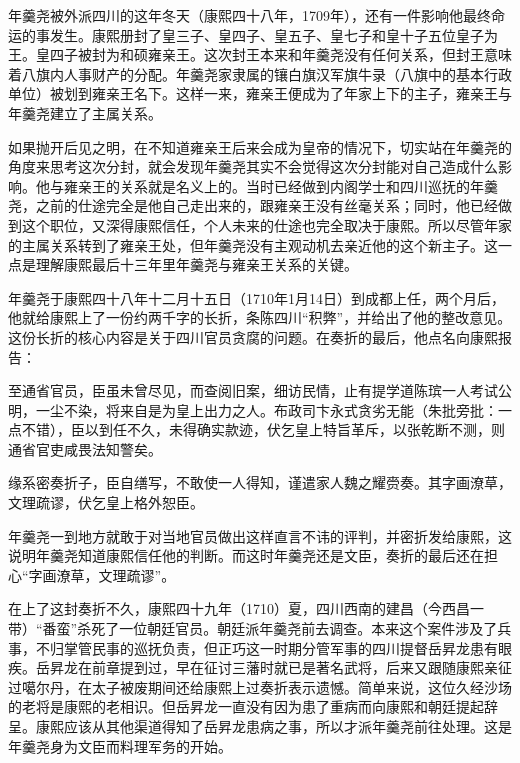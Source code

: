 
年羹尧被外派四川的这年冬天（康熙四十八年，1709年），还有一件影响他最终命运的事发生。康熙册封了皇三子、皇四子、皇五子、皇七子和皇十子五位皇子为王。皇四子被封为和硕雍亲王。这次封王本来和年羹尧没有任何关系，但封王意味着八旗内人事财产的分配。年羹尧家隶属的镶白旗汉军旗牛录（八旗中的基本行政单位）被划到雍亲王名下。这样一来，雍亲王便成为了年家上下的主子，雍亲王与年羹尧建立了主属关系。



如果抛开后见之明，在不知道雍亲王后来会成为皇帝的情况下，切实站在年羹尧的角度来思考这次分封，就会发现年羹尧其实不会觉得这次分封能对自己造成什么影响。他与雍亲王的关系就是名义上的。当时已经做到内阁学士和四川巡抚的年羹尧，之前的仕途完全是他自己走出来的，跟雍亲王没有丝毫关系；同时，他已经做到这个职位，又深得康熙信任，个人未来的仕途也完全取决于康熙。所以尽管年家的主属关系转到了雍亲王处，但年羹尧没有主观动机去亲近他的这个新主子。这一点是理解康熙最后十三年里年羹尧与雍亲王关系的关键。



年羹尧于康熙四十八年十二月十五日（1710年1月14日）到成都上任，两个月后，他就给康熙上了一份约两千字的长折，条陈四川“积弊”，并给出了他的整改意见。这份长折的核心内容是关于四川官员贪腐的问题。在奏折的最后，他点名向康熙报告：



\begin{bookquote}至通省官员，臣虽未曾尽见，而查阅旧案，细访民情，止有提学道陈瑸一人考试公明，一尘不染，将来自是为皇上出力之人。布政司卞永式贪劣无能（朱批旁批：一点不错），臣以到任不久，未得确实款迹，伏乞皇上特旨革斥，以张乾断不测，则通省官吏咸畏法知警矣。\end{bookquote}


\begin{bookquote}缘系密奏折子，臣自缮写，不敢使一人得知，谨遣家人魏之耀赍奏。其字画潦草，文理疏谬，伏乞皇上格外恕臣。\end{bookquote}


年羹尧一到地方就敢于对当地官员做出这样直言不讳的评判，并密折发给康熙，这说明年羹尧知道康熙信任他的判断。而这时年羹尧还是文臣，奏折的最后还在担心“字画潦草，文理疏谬”。



在上了这封奏折不久，康熙四十九年（1710）夏，四川西南的建昌（今西昌一带）“番蛮”杀死了一位朝廷官员。朝廷派年羹尧前去调查。本来这个案件涉及了兵事，不归掌管民事的巡抚负责，但正巧这一时期分管军事的四川提督岳昇龙患有眼疾。岳昇龙在前章提到过，早在征讨三藩时就已是著名武将，后来又跟随康熙亲征过噶尔丹，在太子被废期间还给康熙上过奏折表示遗憾。简单来说，这位久经沙场的老将是康熙的老相识。但岳昇龙一直没有因为患了重病而向康熙和朝廷提起辞呈。康熙应该从其他渠道得知了岳昇龙患病之事，所以才派年羹尧前往处理。这是年羹尧身为文臣而料理军务的开始。


